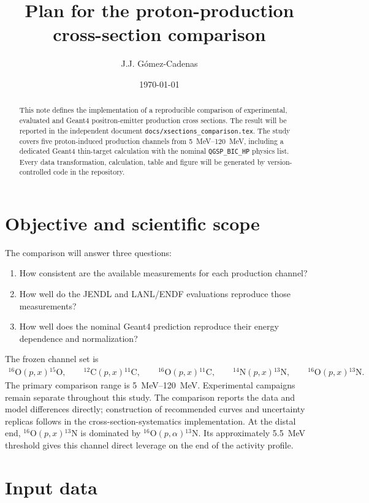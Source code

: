 \documentclass[11pt]{article}
\title{Plan for the proton-production\\cross-section comparison}
\author{J.J. G\'omez-Cadenas}
\date{\today}
\newcommand{\file}[1]{\texttt{#1}}
\newcommand{\Ox}[1]{{}^{#1}\mathrm{O}}
\newcommand{\Cl}[1]{{}^{#1}\mathrm{C}}
\newcommand{\Ni}[1]{{}^{#1}\mathrm{N}}
\begin{document}
\maketitle

\begin{abstract}
This note defines the implementation of a reproducible comparison of
experimental, evaluated and Geant4 positron-emitter production cross sections.
The result will be reported in the independent document
\file{docs/xsections\_comparison.tex}.  The study covers five proton-induced
production channels from \SIrange{5}{120}{MeV}, including a dedicated Geant4
thin-target calculation with the nominal \file{QGSP\_BIC\_HP} physics list.
Every data transformation, calculation, table and figure will be generated by
version-controlled code in the repository.
\end{abstract}

\section{Objective and scientific scope}

The comparison will answer three questions:
\begin{enumerate}[nosep]
  \item How consistent are the available measurements for each production
        channel?
  \item How well do the JENDL and LANL/ENDF evaluations reproduce those
        measurements?
  \item How well does the nominal Geant4 prediction reproduce their energy
        dependence and normalization?
\end{enumerate}

The frozen channel set is
\begin{align}
  \Ox{16}(p,x)\Ox{15},\qquad
  \Cl{12}(p,x)\Cl{11},\qquad
  \Ox{16}(p,x)\Cl{11},\qquad
  \Ni{14}(p,x)\Ni{13},\qquad
  \Ox{16}(p,x)\Ni{13}.
\end{align}
The primary comparison range is \SIrange{5}{120}{MeV}.  Experimental campaigns
remain separate throughout this study.  The comparison reports the data and
model differences directly; construction of recommended curves and uncertainty
replicas follows in the cross-section-systematics implementation.
At the distal end, $\Ox{16}(p,x)\Ni{13}$ is dominated by
$\Ox{16}(p,\alpha)\Ni{13}$.  Its approximately \SI{5.5}{MeV} threshold gives
this channel direct leverage on the end of the activity profile.

\section{Input data}
\end{document}
